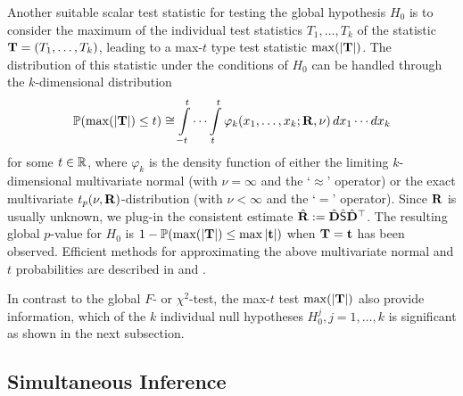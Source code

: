 \documentclass[12pt]{article}
\begin{document}
Another suitable scalar test statistic for testing the global hypothesis
$H_0$ is to consider the maximum of the individual test statistics
$T_1, \dots, T_k$ of the statistic 
$\mathbf{T} = (T_1, \dots, T_k)$, leading to a max-$t$ type test statistic $\max(|\mathbf{T}|)$.
The distribution of this statistic under the conditions of $H_0$
can be handled through the $k$-dimensional distribution
\begin{eqnarray}
\label{maxt}
\mathbb{P}(\max(|\mathbf{T}|) \le t)  \cong  \int\limits_{-t}^t \cdots \int\limits_{t}^t
\varphi_k(x_1, \dots, x_k; \mathbf{R}, \nu) \, dx_1 \cdots dx_k
\end{eqnarray}
for some $t \in \mathbb{R}$, where $\varphi_k$ is the density function of either the limiting
$k$-dimensional multivariate
normal (with $\nu = \infty$ and the `$\approx$' operator) or the exact multivariate $t_p(\nu,
\mathbf{R})$-distribution (with $\nu < \infty$ and the `$=$' operator).
Since $\mathbf{R}$ is usually unknown, we plug-in the consistent estimate
$\hat{\mathbf{R}} := \hat{\mathbf{D}} \hat{\textsf{S}} \hat{\mathbf{D}}^\top$.
The resulting global $p$-value for $H_0$ is $1 - \mathbb{P}(\max(|\mathbf{T}|) \le \max|\mathbf{t}|)$
when $\mathbf{T} = \mathbf{t}$ has been observed.
Efficient methods
for approximating the above multivariate normal and $t$
probabilities are described in \cite{Genz1992,GenzBretz1999,BretzGenzHothorn2001}
and \cite{GenzBretz2002}.

In contrast to the global $F$- or $\chi^2$-test,
the max-$t$ test $\max(|\mathbf{T}|)$ also provide information,
which of the $k$ individual null hypotheses $H_0^j, j = 1, \dots, k$
is significant as shown in the next subsection.

\subsection{Simultaneous Inference} \label{simtest}
\end{document}

